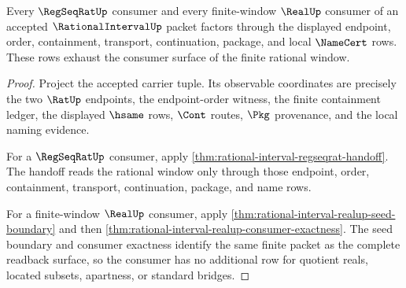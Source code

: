 \begin{theorem}
\label{thm:rational-interval-window-consumer-exhaustion}
Every $\RegSeqRatUp$ consumer and every finite-window $\RealUp$ consumer of an
accepted $\RationalIntervalUp$ packet factors through the displayed endpoint,
order, containment, transport, continuation, package, and local $\NameCert$
rows. These rows exhaust the consumer surface of the finite rational window.
\end{theorem}
\begin{proof}
Project the accepted carrier tuple. Its observable coordinates are precisely
the two $\RatUp$ endpoints, the endpoint-order witness, the finite containment
ledger, the displayed $\hsame$ rows, $\Cont$ routes, $\Pkg$ provenance, and
the local naming evidence.

For a $\RegSeqRatUp$ consumer, apply
\autoref{thm:rational-interval-regseqrat-handoff}. The handoff reads the
rational window only through those endpoint, order, containment, transport,
continuation, package, and name rows.

For a finite-window $\RealUp$ consumer, apply
\autoref{thm:rational-interval-realup-seed-boundary} and then
\autoref{thm:rational-interval-realup-consumer-exactness}. The seed boundary
and consumer exactness identify the same finite packet as the complete
readback surface, so the consumer has no additional row for quotient reals,
located subsets, apartness, or standard bridges.
\end{proof}


